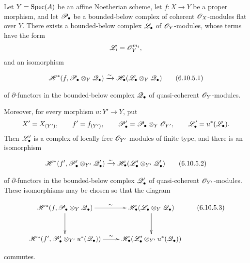 \begin{theorem}[6.10.5]
\label{III.6.10.5}
Let $Y=\operatorname{Spec}(A)$ be an affine Noetherian scheme, let
$f:X\to Y$ be a proper morphism, and let $\mathscr{P}_\bullet$ be a
bounded-below complex of coherent $\mathscr{O}_X$-modules flat over
$Y$.  There exists a bounded-below complex $\mathscr{L}_\bullet$ of
$\mathscr{O}_Y$-modules, whose terms have the form
\[
  \mathscr{L}_i=\mathscr{O}_Y^{m_i},
\]
and an isomorphism
\begin{env}[6.10.5.1]
\label{III.6.10.5.1}
\[
  \mathscr{H}^*
  (f,\mathscr{P}_\bullet\otimes_Y\mathscr{Q}_\bullet)
  \xrightarrow{\sim}
  \mathscr{H}_\bullet
  (\mathscr{L}_\bullet\otimes_Y\mathscr{Q}_\bullet)
  \tag{6.10.5.1}\label{III.6.10.5.1.eq}
\]
\end{env}
of $\partial$-functors in the bounded-below complex
$\mathscr{Q}_\bullet$ of quasi-coherent $\mathscr{O}_Y$-modules.

Moreover, for every morphism $u:Y'\to Y$, put
\[
  X'=X_{(Y')},
  \qquad
  f'=f_{(Y')},
  \qquad
  \mathscr{P}_\bullet'
  =
  \mathscr{P}_\bullet\otimes_Y\mathscr{O}_{Y'},
  \qquad
  \mathscr{L}_\bullet'=u^*(\mathscr{L}_\bullet).
\]
Then $\mathscr{L}_\bullet'$ is a complex of locally free
$\mathscr{O}_{Y'}$-modules of finite type, and there is an isomorphism
\begin{env}[6.10.5.2]
\label{III.6.10.5.2}
\[
  \mathscr{H}^*
  (f',\mathscr{P}_\bullet'\otimes_{Y'}\mathscr{Q}_\bullet')
  \xrightarrow{\sim}
  \mathscr{H}_\bullet
  (\mathscr{L}_\bullet'\otimes_{Y'}\mathscr{Q}_\bullet')
  \tag{6.10.5.2}\label{III.6.10.5.2.eq}
\]
\end{env}
of $\partial$-functors in the bounded-below complex
$\mathscr{Q}_\bullet'$ of quasi-coherent $\mathscr{O}_{Y'}$-modules.  These
isomorphisms may be chosen so that the diagram
\begin{env}[6.10.5.3]
\label{III.6.10.5.3}
\[
\xymatrix@C=24pt@R=30pt{
  \sh H^*
  (f,\sh P_\bullet\otimes_Y\sh Q_\bullet)
  \ar[r]^-{\sim}\ar[d]
  &
  \sh H_\bullet
  (\sh L_\bullet\otimes_Y\sh Q_\bullet)
  \ar[d]
  \\
  \sh H^*
  (f',\sh P_\bullet'\otimes_{Y'}u^*(\sh Q_\bullet))
  \ar[r]^-{\sim}
  &
  \sh H_\bullet
  (\sh L_\bullet'\otimes_{Y'}u^*(\sh Q_\bullet))
}
\tag{6.10.5.3}\label{III.6.10.5.3.eq}
\]
\end{env}
commutes.
\end{theorem}

